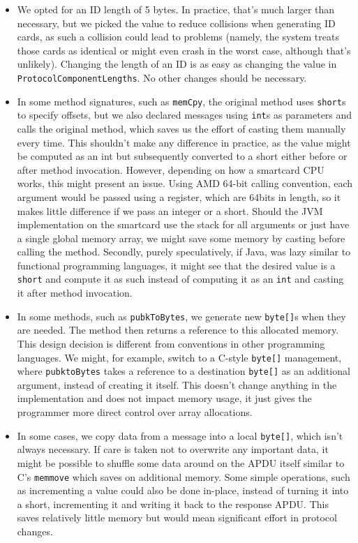 \documentclass[a4paper]{article}
\begin{document}
\begin{itemize}
    \item We opted for an ID length of 5 bytes. In practice, that's much larger than necessary, but we picked the value to reduce collisions when generating ID cards, as such a collision could lead to problems (namely, the system treats those cards as identical or might even crash in the worst case, although that's unlikely). Changing the length of an ID is as easy as changing the value in \texttt{ProtocolComponentLengths}. No other changes should be necessary.
    \item In some method signatures, such as \texttt{memCpy}, the original method uses \texttt{short}s to specify offsets, but we also declared messages using \texttt{int}s as parameters and calls the original method, which saves us the effort of casting them manually every time. This shouldn't make any difference in practice, as the value might be computed as an int but subsequently converted to a short either before or after method invocation. However, depending on how a smartcard CPU works, this might present an issue. Using AMD 64-bit calling convention, each argument would be passed using a register, which are 64bits in length, so it makes little difference if we pass an integer or a short. Should the JVM implementation on the smartcard use the stack for all arguments or just have a single global memory array, we might save some memory by casting before calling the method. Secondly, purely speculatively, if Java, was lazy similar to functional programming languages, it might see that the desired value is a \texttt{short} and compute it as such instead of computing it as an \texttt{int} and casting it after method invocation.
    \item In some methods, such as \texttt{pubkToBytes}, we generate new \texttt{byte[]}s when they are needed. The method then returns a reference to this allocated memory. This design decision is different from conventions in other programming languages. We might, for example, switch to a C-style \texttt{byte[]} management, where \texttt{pubktoBytes} takes a reference to a destination \texttt{byte[]} as an additional argument, instead of creating it itself. This doesn't change anything in the implementation and does not impact memory usage, it just gives the programmer more direct control over array allocations.
    \item In some cases, we copy data from a message into a local \texttt{byte[]}, which isn't always necessary. If care is taken not to overwrite any important data, it might be possible to shuffle some data around on the APDU itself similar to C's \texttt{memmove} which saves on additional memory. Some simple operations, such as incrementing a value could also be done in-place, instead of turning it into a short, incrementing it and writing it back to the response APDU. This saves relatively little memory but would mean significant effort in protocol changes. 

\end{itemize}
\end{document}
